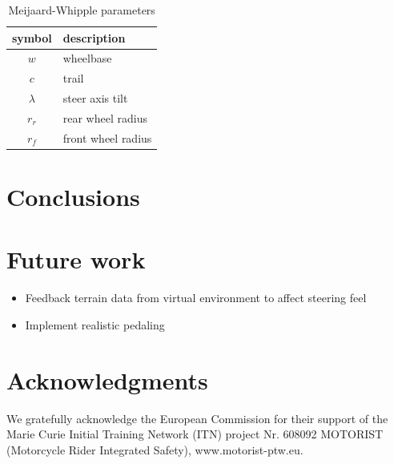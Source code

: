 \documentclass[11pt,a4paper,reqno]{amsart}
\begin{document}
\begin{table}
    \centering
    \begin{tabular}{|c|l|}
        \hline
        symbol & description \\
        \hline
        $ w $ & wheelbase \\
        $ c $ & trail \\
        $ \lambda $ & steer axis tilt \\
        $ r_r $ & rear wheel radius \\
        $ r_f $ & front wheel radius \\
        \hline
    \end{tabular}
    \caption{Meijaard-Whipple parameters}
    \label{tab:parameters}
\end{table}

\section{Conclusions}
\section{Future work}
\begin{itemize}
    \item Feedback terrain data from virtual environment to affect steering feel
    \item Implement realistic pedaling
\end{itemize}

\section{Acknowledgments}
We gratefully acknowledge the European Commission for their support of the Marie Curie Initial Training Network (ITN)
project Nr. 608092 MOTORIST (Motorcycle Rider Integrated Safety), www.motorist-ptw.eu.



\end{document}
